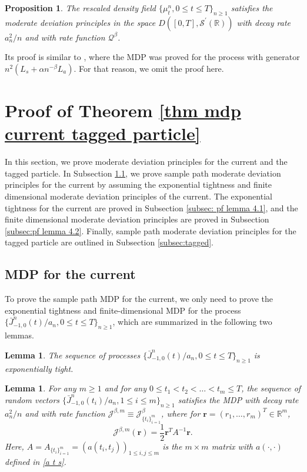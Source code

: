 \documentclass[reqno,11pt]{amsart}
\numberwithin{equation}{section}
\newtheorem{lemma}[theorem]{Lemma}
\newtheorem{proposition}[theorem]{Proposition}
\newcommand{\R}{\mathbb{R}}
\begin{document}
\begin{proposition}\label{prop MPD of the scaled density field}
	The rescaled density field $\{\mu^n_t, 0 \leq t \leq T\}_{n\geq 1}$ satisfies the moderate deviation principles in the space $D([0,T],\mathcal{S}^\prime (\R))$ with decay rate $a_n^2 / n$ and with rate function $\mathcal{Q}^\beta$.    
\end{proposition}

 Its proof is similar to \cite{zhao2024moderate}, where the MDP was proved for the process with generator $n^2 (L_s + \alpha n^{-\beta} L_a)$. For that reason, we omit the proof here.



\section{Proof of Theorem \ref{thm mdp current tagged particle}}\label{sec: proof}

In this section, we prove moderate deviation principles for the current and the tagged particle. In Subsection \ref{subsec: current}, we prove sample path moderate deviation principles for the current by assuming the exponential tightness and finite dimensional moderate deviation principles of the current. The exponential tightness for the current are proved in Subsection \ref{subsec: pf lemma 4.1}, and the finite dimensional moderate deviation principles are proved in Subsection \ref{subsec:pf lemma 4.2}.  Finally, sample path moderate deviation principles for the tagged particle are outlined in Subsection \ref{subsec:tagged}.

\subsection{MDP for the current}\label{subsec: current} To prove the sample path MDP for the current, we only need to prove the exponential tightness and finite-dimensional MDP for the process $\{\bar{J}^n_{-1,0} (t)/a_n, 0 \leq t \leq T\}_{n \geq 1}$, which are summarized in the following two lemmas. 

\begin{lemma}\label{lem: exp tight current}
The sequence of processes $\{\bar{J}^n_{-1,0}(t) / a_n, 0 \leq t \leq T\}_{n \geq 1}$ is exponentially tight.
\end{lemma} 

\begin{lemma}\label{lem: finiteD mdp current}
For any $m \geq 1$ and for any $0 \leq t_1 < t_2 < \ldots < t_m \leq T$, the sequence of random vectors $\{\bar{J}^n_{-1,0} (t_i)/a_n, 1 \leq i \leq m\}_{n \geq 1}$ satisfies the MDP with decay rate $a_n^2 / n$ and with rate function $\mathcal{J}^{\beta,m} \equiv \mathcal{J}^\beta_{\{t_i\}_{i=1}^m}$, where  for $\mathbf{r} =(r_1,\ldots, r_m)^T\in \mathbb{R}^m$,
\[\mathcal{J}^{\beta,m}  (\mathbf{r}) = \frac{1}{2} \mathbf{r}^T A^{-1} \mathbf{r}.\]
Here, $A = A_{\{t_i\}_{i=1}^m} = (a(t_i,t_j))_{1 \leq i,j \leq m}$ is the $m \times m$ matrix with $a(\cdot,\cdot)$ defined in \eqref{a t s}. 
\end{lemma}
\end{document}
